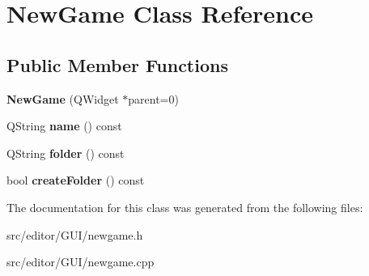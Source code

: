 \hypertarget{class_new_game}{\section{\-New\-Game \-Class \-Reference}
\label{class_new_game}
}
\subsection*{\-Public \-Member \-Functions}
\begin{DoxyCompactItemize}
\item 
\hypertarget{class_new_game_abc0dccbe2a43eef32570473265de9a8a}{{\bfseries \-New\-Game} (\-Q\-Widget $\ast$parent=0)}\label{class_new_game_abc0dccbe2a43eef32570473265de9a8a}

\item 
\hypertarget{class_new_game_a7fd556a28c38e6c1c46ea227acad99bd}{\-Q\-String {\bfseries name} () const }\label{class_new_game_a7fd556a28c38e6c1c46ea227acad99bd}

\item 
\hypertarget{class_new_game_ae53e79a27fdd2b0610f5f98500f299cb}{\-Q\-String {\bfseries folder} () const }\label{class_new_game_ae53e79a27fdd2b0610f5f98500f299cb}

\item 
\hypertarget{class_new_game_a5f883cc09386cca3247acac873a36777}{bool {\bfseries create\-Folder} () const }\label{class_new_game_a5f883cc09386cca3247acac873a36777}

\end{DoxyCompactItemize}


\-The documentation for this class was generated from the following files\-:\begin{DoxyCompactItemize}
\item 
src/editor/\-G\-U\-I/newgame.\-h\item 
src/editor/\-G\-U\-I/newgame.\-cpp\end{DoxyCompactItemize}
